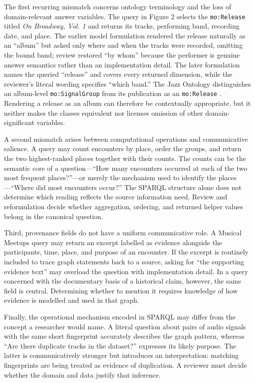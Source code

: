 The first recurring mismatch concerns ontology terminology and the loss of domain-relevant answer variables. The query in Figure 2 selects the \texttt{mo:Release} titled \emph{On Broadway, Vol. 1} and returns its tracks, performing band, recording date, and place. The earlier model formulation rendered the release naturally as an ``album'' but asked only where and when the tracks were recorded, omitting the bound band; review restored ``by whom'' because the performer is genuine answer semantics rather than an implementation detail. The later formulation names the queried ``release'' and covers every returned dimension, while the reviewer's literal wording specifies ``which band.'' The Jazz Ontology distinguishes an album-level \texttt{mo:SignalGroup} from its publication as an \texttt{mo:Release} \citep{proutskova2022jazz}. Rendering a release as an album can therefore be contextually appropriate, but it neither makes the classes equivalent nor licenses omission of other domain-significant variables.

A second mismatch arises between computational operations and communicative salience. A query may count encounters by place, order the groups, and return the two highest-ranked places together with their counts. The counts can be the semantic core of a question---``How many encounters occurred at each of the two most frequent places?''---or merely the mechanism used to identify the places---``Where did most encounters occur?'' The SPARQL structure alone does not determine which reading reflects the source information need. Review and reformulation decide whether aggregation, ordering, and returned helper values belong in the canonical question.

Third, provenance fields do not have a uniform communicative role. A Musical Meetups query may return an excerpt labelled as evidence alongside the participants, time, place, and purpose of an encounter. If the excerpt is routinely included to trace graph statements back to a source, asking for ``the supporting evidence text'' may overload the question with implementation detail. In a query concerned with the documentary basis of a historical claim, however, the same field is central. Determining whether to mention it requires knowledge of how evidence is modelled and used in that graph.

Finally, the operational mechanism encoded in SPARQL may differ from the concept a researcher would name. A literal question about pairs of audio signals with the same short fingerprint accurately describes the graph pattern, whereas ``Are there duplicate tracks in the dataset?'' expresses its likely purpose. The latter is communicatively stronger but introduces an interpretation: matching fingerprints are being treated as evidence of duplication. A reviewer must decide whether the domain and data justify that inference.

